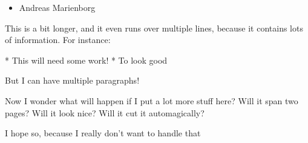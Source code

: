 \documentclass[30pt, Screen4to3]{foils}
\begin{document}
\begin{itemize}
\item Andreas Marienborg
\end{itemize}

This is a bit longer, and
it even runs over multiple lines, because it contains lots of information. For instance:

* This will need some work!
* To look good

But I can have multiple paragraphs!

Now I wonder what will happen if I put a lot more stuff here? Will it span two pages? Will it look nice? Will it cut it automagically?

I hope so, because I really don't want to handle that

\end{document}
